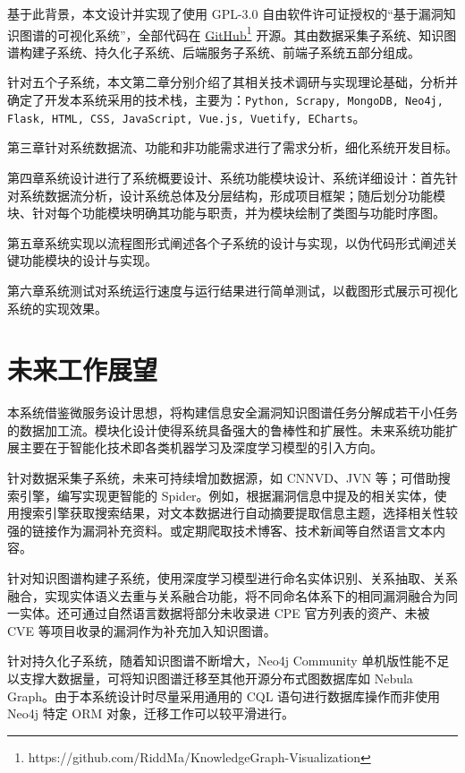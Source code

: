 \documentclass[a4paper,AutoFakeBold,oneside,12pt]{book}
\begin{document}
基于此背景，本文设计并实现了使用 GPL-3.0 自由软件许可证授权的“基于漏洞知识图谱的可视化系统”，全部代码在 \href{https://github.com/RiddMa/KnowledgeGraph-Visualization}{GitHub}\footnote{https://github.com/RiddMa/KnowledgeGraph-Visualization} 开源。其由数据采集子系统、知识图谱构建子系统、持久化子系统、后端服务子系统、前端子系统五部分组成。

针对五个子系统，本文第二章分别介绍了其相关技术调研与实现理论基础，分析并确定了开发本系统采用的技术栈，主要为：\lstinline|Python, Scrapy, MongoDB, Neo4j, Flask, HTML, CSS, JavaScript, Vue.js, Vuetify, ECharts|。

第三章针对系统数据流、功能和非功能需求进行了需求分析，细化系统开发目标。

第四章系统设计进行了系统概要设计、系统功能模块设计、系统详细设计：首先针对系统数据流分析，设计系统总体及分层结构，形成项目框架；随后划分功能模块、针对每个功能模块明确其功能与职责，并为模块绘制了类图与功能时序图。

第五章系统实现以流程图形式阐述各个子系统的设计与实现，以伪代码形式阐述关键功能模块的设计与实现。

第六章系统测试对系统运行速度与运行结果进行简单测试，以截图形式展示可视化系统的实现效果。

\section{未来工作展望}

本系统借鉴微服务设计思想，将构建信息安全漏洞知识图谱任务分解成若干小任务的数据加工流。模块化设计使得系统具备强大的鲁棒性和扩展性。未来系统功能扩展主要在于智能化技术即各类机器学习及深度学习模型的引入方向。

针对数据采集子系统，未来可持续增加数据源，如 CNNVD、JVN 等；可借助搜索引擎，编写实现更智能的 Spider。例如，根据漏洞信息中提及的相关实体，使用搜索引擎获取搜索结果，对文本数据进行自动摘要提取信息主题，选择相关性较强的链接作为漏洞补充资料。或定期爬取技术博客、技术新闻等自然语言文本内容。

针对知识图谱构建子系统，使用深度学习模型进行命名实体识别、关系抽取、关系融合，实现实体语义去重与关系融合功能，将不同命名体系下的相同漏洞融合为同一实体。还可通过自然语言数据将部分未收录进 CPE 官方列表的资产、未被 CVE 等项目收录的漏洞作为补充加入知识图谱。

针对持久化子系统，随着知识图谱不断增大，Neo4j Community 单机版性能不足以支撑大数据量，可将知识图谱迁移至其他开源分布式图数据库如 Nebula Graph。由于本系统设计时尽量采用通用的 CQL 语句进行数据库操作而非使用 Neo4j 特定 ORM 对象，迁移工作可以较平滑进行。
\end{document}
